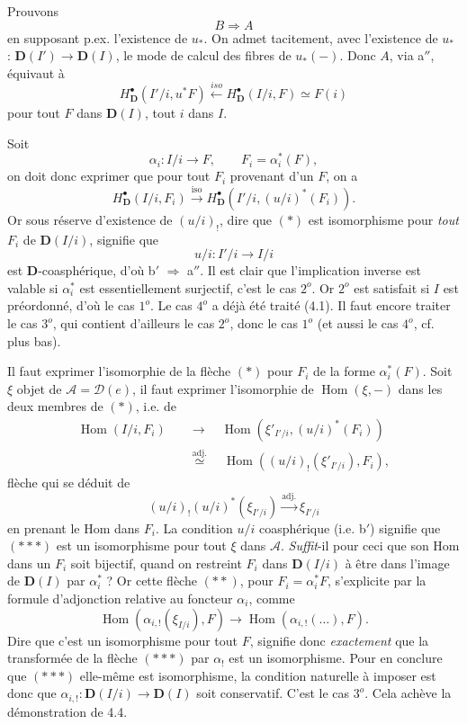 \documentclass[11pt]{article}
\newcommand{\printedpage}[1]{\marginpar{\footnotesize p.~#1}}
\def\dcprintedpending{}
\newcommand{\msp}[1]{\marginpar{\footnotesize\raggedright
  \ifx\dcprintedpending\empty\else p.~\dcprintedpending\par\fi
  [#1]}\gdef\dcprintedpending{}}
\newcommand{\Hom}{\operatorname{Hom}}
\newcommand{\bD}{\mathbf{D}}
\begin{document}
Prouvons
\[
B \Longrightarrow A
\]
en supposant p.ex. l'existence de $u_*$. On admet tacitement, avec l'existence de $u_*$ : $\bD(I') \longrightarrow \bD(I)$, le mode de calcul des fibres de $u_*(-)$. Donc $A$, via a$''$, équivaut à
\[
H^{\bullet}_{\bD}(I'/i, u^*F) \xleftarrow{\mathit{iso}} H^{\bullet}_{\bD}(I/i, F) \simeq F(i)
\]
\printedpage{38}
pour tout $F$ dans $\bD(I)$, tout $i$ dans $I$.

Soit
\[
\alpha_i : I/i \longrightarrow F, \qquad F_i = \alpha_i^*(F), %
\]
on doit donc exprimer que pour tout $F_i$ provenant d'un $F$, on a
\[
H^{\bullet}_{\bD}(I/i, F_i) \xrightarrow{\mathrm{iso}} H^{\bullet}_{\bD}(I'/i, (u/i)^*(F_i)). \tag*{$(\ast)$}
\]
Or sous réserve d'existence de $(u/i)_!$, dire que $(\ast)$ est isomorphisme pour \textit{tout} $F_i$ de $\bD(I/i)$, signifie que
\[
u/i : I'/i \longrightarrow I/i
\]
\msp{page 62}est $\bD$-coasphérique, d'où b$'$ $\Longrightarrow$ a$''$. Il est clair que l'implication inverse est valable si $\alpha_i^*$ est essentiellement surjectif, c'est le cas $2^o$. Or $2^o$ est satisfait si $I$ est préordonné, d'où le cas $1^o$. Le cas $4^o$ a déjà été traité (4.1). Il faut encore traiter le cas $3^o$, qui contient d'ailleurs le cas $2^o$, donc le cas $1^o$ (et aussi le cas $4^o$, cf. plus bas).

Il faut exprimer l'isomorphie de la flèche $(\ast)$ pour $F_i$ de la forme $\alpha_i^*(F)$. Soit $\xi$ objet de $\mathcal{A} = \mathcal{D}(e)$, il faut exprimer l'isomorphie de $\Hom(\xi, -)$ dans les deux membres de $(\ast)$, i.e. de
\[
\begin{aligned}
\Hom(I/i, F_i) \quad &\longrightarrow \quad \Hom(\xi'_{I'/i}, (u/i)^*(F_i)) \\
&\overset{\text{adj.}}{\simeq} \quad \Hom((u/i)_!(\xi'_{I'/i}), F_i),
\end{aligned}
\tag*{$(\ast\ast)$}
\]
 flèche qui se déduit de
\[
(u/i)_!(u/i)^*(\xi_{I'/i}) \xrightarrow{\text{adj.}} \xi_{I'/i} \tag*{$(\ast\ast\ast)$}
\]
en prenant le Hom dans $F_i$. La condition $u/i$ coasphérique (i.e. b$'$) signifie que $(\ast\ast\ast)$ est un isomorphisme pour tout $\xi$ dans $\mathcal{A}$. \textit{Suffit}-il pour ceci que son Hom dans un $F_i$ soit bijectif, quand on restreint $F_i$ dans $\bD(I/i)$ à être dans l'image de $\bD(I)$ par $\alpha_i^*$ ? Or cette flèche $(\ast\ast)$, pour $F_i = \alpha_i^*F$, s'explicite par la formule d'adjonction relative \msp{page 63}au foncteur $\alpha_i$, comme
\[
\Hom(\alpha_{i,!}(\xi_{I/i}), F) \longrightarrow \Hom(\alpha_{i,!}(\ldots), F).
\]
Dire que c'est un isomorphisme pour tout $F$, signifie donc \textit{exactement} que la transformée de la flèche $(\ast\ast\ast)$ par $\alpha_!$ est un isomorphisme. Pour en conclure que $(\ast\ast\ast)$ elle-même est isomorphisme, la condition naturelle à imposer est donc que $\alpha_{i,!} : \bD(I/i) \longrightarrow \bD(I)$ soit conservatif. C'est le cas $3^o$. Cela achève la démonstration de 4.4.
\end{document}
